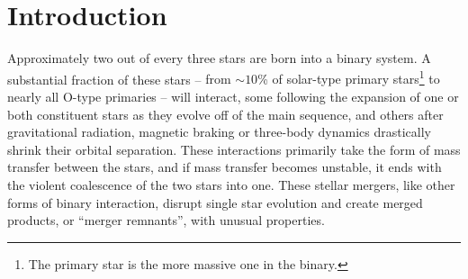 \chapter{Introduction}


Approximately two out of every three stars are born into a binary system.  A substantial fraction of these stars -- {\charles from $\sim10$\% of solar-type primary stars\footnote{{\charles The primary star is the more massive one in the binary.}} to nearly all O-type primaries \citep{moed16} }-- will interact, some following the expansion of one or both constituent stars as they evolve off of the main sequence, and others after gravitational radiation, magnetic braking or three-body dynamics drastically shrink their orbital separation.  These interactions primarily take the form of mass transfer between the stars, and if mass transfer becomes unstable, it ends with the violent coalescence of the two stars into one.  These stellar mergers, like other forms of binary interaction, disrupt single star evolution and create merged products, or ``merger remnants'', with unusual properties.


